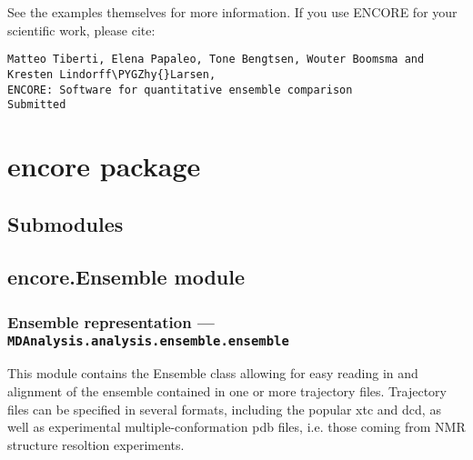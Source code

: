 \documentclass[letterpaper,10pt,english]{sphinxmanual}
\def\PYGZhy{\char`\-}
\begin{document}
See the examples themselves for more information.
If you use ENCORE for your scientific work, please cite:

\begin{Verbatim}[frame=single,commandchars=\\\{\}]
Matteo Tiberti, Elena Papaleo, Tone Bengtsen, Wouter Boomsma and Kresten Lindorff\PYGZhy{}Larsen,
ENCORE: Software for quantitative ensemble comparison
Submitted
\end{Verbatim}


\chapter{encore package}
\label{index:encore-package}

\section{Submodules}
\label{index:submodules}

\section{encore.Ensemble module}
\label{index:module-encore.Ensemble}\label{index:encore-ensemble-module}

\subsection{Ensemble representation --- \texttt{MDAnalysis.analysis.ensemble.ensemble}}
\label{index:ensemble-representation-mdanalysis-analysis-ensemble-ensemble}
This module contains the Ensemble class allowing for easy reading in 
and alignment of the ensemble contained in one or more trajectory files.
Trajectory files can be specified in several formats, including the popular
xtc and dcd, as well as experimental multiple-conformation pdb files, i.e.
those coming from NMR structure resoltion experiments.
\end{document}

